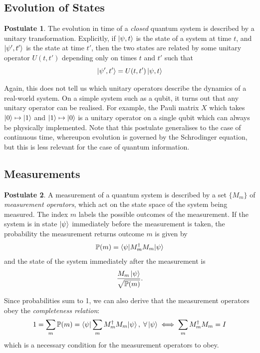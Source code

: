 \documentclass[12pt,a4paper]{report}
\numberwithin{equation}{section}
\theoremstyle{definition}
\theoremstyle{theorem}
\theoremstyle{theorem}
\theoremstyle{example}
\theoremstyle{definition}
\newtheorem{postulate}{Postulate}
\begin{document}
\subsection{Evolution of States}
\begin{postulate}
	The evolution in time of a \textit{closed} quantum system is described by a unitary transformation. Explicitly, if $\ket{\psi,t}$ is the state of a system at time $t$, and $\ket{\psi',t'}$ is the state at time $t'$, then the two states are related by some unitary operator $U(t,t')$ depending only on times $t$ and $t'$ such that
	\begin{equation}
		\ket{\psi',t'}=U(t,t')\ket{\psi,t}
	\end{equation}
\end{postulate}
Again, this does not tell us which unitary operators describe the dynamics of a real-world system. On a simple system such as a qubit, it turns out that any unitary operator can be realised. For example, the Pauli matrix $X$ which takes $\ket{0}\mapsto\ket{1}$ and $\ket{1}\mapsto\ket{0}$ is a unitary operator on a single qubit which can always be physically implemented. Note that this postulate generalises to the case of continuous time, whereupon evolution is governed by the Schrodinger equation, but this is less relevant for the case of quantum information.

\subsection{Measurements}
\begin{postulate}
	A measurement of a quantum system is described by a set $\{M_{m}\}$ of \textit{measurement operators}, which act on the state space of the system being measured. The index $m$ labels the possible outcomes of the measurement. If the system is in state $\ket{\psi}$ immediately before the measurement is taken, the probability the measurement returns outcome $m$ is given by
	\begin{equation}
		\mathbb{P}(m)=\braket{\psi|M_{m}^{\dagger}M_{m}|\psi}
	\end{equation}
	and the state of the system immediately after the measurement is
	\begin{equation}
		\frac{M_{m}\ket{\psi}}{\sqrt{\mathbb{P}(m)}}.
	\end{equation}
\end{postulate}
Since probabilities sum to 1, we can also derive that the measurement operators obey the \textit{completeness relation}:
\begin{equation}
	1=\sum_{m}\mathbb{P}(m)=\braket{\psi|\sum_{m}M_{m}^{\dagger}M_{m}|\psi},\;\forall \ket{\psi}\iff \sum_{m}M_{m}^{\dagger}M_{m}=I
\end{equation}
which is a necessary condition for the measurement operators to obey.
\end{document}
